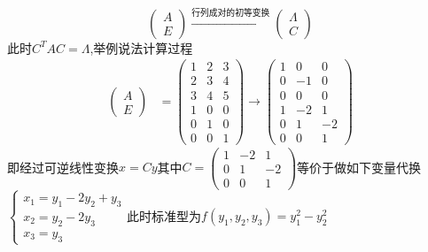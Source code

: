 \documentclass[12pt, a4paper, oneside, UTF8]{ctexbook}
\begin{document}
\begin{definition}[合同变化法]
    $$
    \begin{pmatrix}
        A \\
        E
    \end{pmatrix} \xrightarrow{\text{行列成对的初等变换}} \begin{pmatrix}
        \Lambda \\
        C
    \end{pmatrix}
    $$此时$C^TAC=\Lambda$,举例说法计算过程
    \begin{align*}
        \begin{pmatrix}
            A \\
            E 
        \end{pmatrix} &= \begin{pmatrix}
            1 & 2 & 3 \\
            2 & 3 & 4 \\
            3 & 4 & 5 \\
            \hline 
            1 & 0 & 0 \\
            0 & 1 & 0 \\
            0 & 0 & 1
        \end{pmatrix}\xrightarrow{}\begin{pmatrix}
            1 & 0 & 0 \\
            0 & -1 & 0 \\
            0 & 0 & 0 \\
            \hline 
            1 & -2 & 1 \\
            0 & 1 & -2 \\
            0 & 0 & 1
        \end{pmatrix}
    \end{align*}
    即经过可逆线性变换$x=Cy$其中$C=\begin{pmatrix}
        1 & -2 & 1 \\
        0 & 1 & -2 \\
        0 & 0 & 1
    \end{pmatrix}$等价于做如下变量代换$\begin{cases}
        x_1 = y_1 - 2y_2 + y_3 \\
        x_2 = y_2 - 2y_3 \\
        x_3 = y_3 
    \end{cases}$此时标准型为$f(y_1,y_2,y_3)=y_1^2-y_2^2$
\end{definition}
\end{document}
